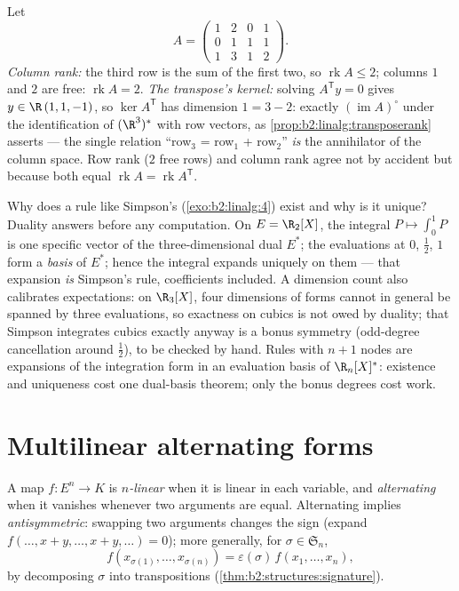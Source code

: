 \begin{example}\label{ex:b2:linalg:rankbothsides}
Let
\[
A = \begin{pmatrix}
1 & 2 & 0 & 1\\
0 & 1 & 1 & 1\\
1 & 3 & 1 & 2
\end{pmatrix} .
\]
\emph{Column rank:} the third row is the sum of the first two, so
$\operatorname{rk} A \leq 2$; columns $1$ and $2$ are free:
$\operatorname{rk} A = 2$. \emph{The transpose's kernel:} solving
$A^{\mathsf T}y = 0$ gives $y \in \R\,(1, 1, -1)$, so $\ker
A^{\mathsf T}$ has dimension $1 = 3 - 2$: exactly
$(\operatorname{im} A)^\circ$ under the identification of
$(\R^3)^*$ with row vectors, as
\cref{prop:b2:linalg:transposerank} asserts --- the single
relation ``row$_3$ = row$_1$ + row$_2$'' \emph{is} the
annihilator of the column space. Row rank ($2$ free rows) and
column rank agree not by accident but because both equal
$\operatorname{rk} A = \operatorname{rk} A^{\mathsf T}$.
\end{example}

\begin{example}\label{ex:b2:linalg:quadratureread}
Why does a rule like Simpson's (\cref{exo:b2:linalg:4}) exist
and why is it unique? Duality answers before any computation.
On $E = \R_2[X]$, the integral $P \mapsto \int_0^1 P$ is one
specific vector of the three-dimensional dual $E^*$; the
evaluations at $0$, $\frac12$, $1$ form a \emph{basis} of
$E^*$; hence the integral expands uniquely on them --- that
expansion \emph{is} Simpson's rule, coefficients included. A
dimension count also calibrates expectations: on $\R_3[X]$,
four dimensions of forms cannot in general be spanned by three
evaluations, so exactness on cubics is not owed by duality;
that Simpson integrates cubics exactly anyway is a bonus
symmetry (odd-degree cancellation around $\frac12$), to be
checked by hand. Rules with $n + 1$ nodes are expansions of the
integration form in an evaluation basis of $\R_n[X]^*$:
existence and uniqueness cost one dual-basis theorem; only the
bonus degrees cost work.
\end{example}

\section{Multilinear alternating forms}

\begin{definition}\label{def:b2:linalg:alternating}
A map $f \colon E^n \to K$ is \emph{$n$-linear} when it is linear in
each variable, and \emph{alternating} when
it vanishes whenever two arguments are equal. Alternating implies
\emph{antisymmetric}: swapping two arguments changes the sign
(expand $f(\dots, x + y, \dots, x + y, \dots) = 0$); more generally,
for $\sigma \in \mathfrak{S}_n$,
\[
f(x_{\sigma(1)}, \dots, x_{\sigma(n)}) =
\varepsilon(\sigma)\, f(x_1, \dots, x_n),
\]
by decomposing $\sigma$ into transpositions
(\cref{thm:b2:structures:signature}).
\end{definition}


